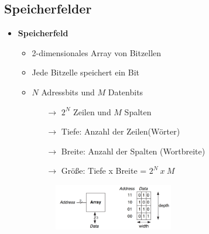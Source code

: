 \documentclass[11pt,a4paper]{article}
\begin{document}
\subsection{Speicherfelder}
\begin{itemize}

\item \textbf{Speicherfeld}
	\begin{itemize}
	\item 2-dimensionales Array von Bitzellen
	\item Jede Bitzelle speichert ein Bit
	\item $N$ Adressbits und $M$ Datenbits
		\begin{itemize}
		\item[$\rightarrow$] $2^N$ Zeilen und $M$ Spalten
		\item[$\rightarrow$] Tiefe: Anzahl der Zeilen(Wörter)
		\item[$\rightarrow$] Breite: Anzahl der Spalten (Wortbreite)
		\item[$\rightarrow$] Größe: Tiefe x Breite = $2^N~x~M$
		\end{itemize}
	\item[]
		\begin{figure}[H]
		\begin{center}
		\includegraphics[height=2cm]{Bilder/speicherfeld}
		\end{center}
		\end{figure}
		

\end{itemize}
\end{itemize}
\end{document}
